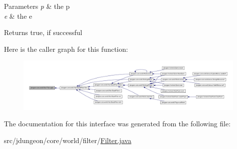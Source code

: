 \begin{DoxyParams}{Parameters}
{\em p} & the p \\
\hline
{\em e} & the e \\
\hline
\end{DoxyParams}
\begin{DoxyReturn}{Returns}
true, if successful 
\end{DoxyReturn}


Here is the caller graph for this function:
\nopagebreak
\begin{figure}[H]
\begin{center}
\leavevmode
\includegraphics[width=400pt]{interfacejdungeon_1_1core_1_1world_1_1filter_1_1_filter_a31f7628b379748e2a7ae0e77ca7d30bf_icgraph}
\end{center}
\end{figure}




The documentation for this interface was generated from the following file:\begin{DoxyCompactItemize}
\item 
src/jdungeon/core/world/filter/\hyperlink{_filter_8java}{Filter.java}\end{DoxyCompactItemize}
